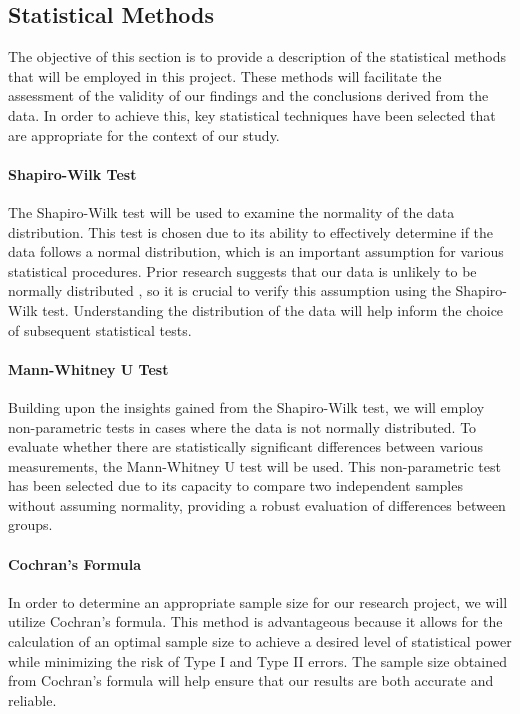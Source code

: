 \subsection{Statistical Methods}
The objective of this section is to provide a description of the statistical methods that will be employed in this project. These methods will facilitate the assessment of the validity of our findings and the conclusions derived from the data. In order to achieve this, key statistical techniques have been selected that are appropriate for the context of our study.

\paragraph{Shapiro-Wilk Test}
The Shapiro-Wilk test will be used to examine the normality of the data distribution. This test is chosen due to its ability to effectively determine if the data follows a normal distribution, which is an important assumption for various statistical procedures. Prior research suggests that our data is unlikely to be normally distributed \cite{biksbois}, so it is crucial to verify this assumption using the Shapiro-Wilk test. Understanding the distribution of the data will help inform the choice of subsequent statistical tests.

\paragraph{Mann-Whitney U Test}
Building upon the insights gained from the Shapiro-Wilk test, we will employ non-parametric tests in cases where the data is not normally distributed. To evaluate whether there are statistically significant differences between various measurements, the Mann-Whitney U test will be used. This non-parametric test has been selected due to its capacity to compare two independent samples without assuming normality, providing a robust evaluation of differences between groups.

\paragraph{Cochran's Formula}
In order to determine an appropriate sample size for our research project, we will utilize Cochran's formula. This method is advantageous because it allows for the calculation of an optimal sample size to achieve a desired level of statistical power while minimizing the risk of Type I and Type II errors. The sample size obtained from Cochran's formula will help ensure that our results are both accurate and reliable.

